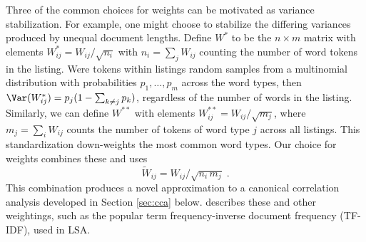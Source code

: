 \documentclass[12pt]{article}
\begin{document}
 Three of the common choices for weights can be motivated as variance stabilization. 
 For example, one might choose to stabilize the differing variances produced by 
 unequal document lengths.  Define
 ${W}^{*}$ to be the $n \times m$ matrix with elements ${W}^{*}_{ij} =
 W_{ij}/\sqrt{n_i}$ with $n_i = \sum_j W_{ij}$ counting the number of word
 tokens in the \ith listing.  Were tokens within listings random samples from a
 multinomial distribution with probabilities $p_{1}, \ldots, p_{m}$ across the word types,
 then $\Var({W}^{*}_{ij}) = p_j(1-\sum_{k\ne j} p_k)$, regardless of the
 number of words in the listing.  Similarly, we can define $W^{**}$ with elements
 $W^{**}_{ij} = W_{ij}/\sqrt{m_j}$, where $m_j = \sum_i W_{ij}$ counts the
 number of tokens of word type $j$ across all listings. This standardization
 down-weights the most common word types.  Our choice for weights combines these and uses
  \begin{equation}
   \widetilde{W}_{ij} = W_{ij}/\sqrt{n_i\,m_j} \;.
  \label{eq:Wtij}
  \end{equation}
  This combination produces a novel approximation to a canonical correlation analysis developed in Section \ref{sec:cca} below. \citet{turney10} describes these and other weightings, such as the popular term frequency-inverse document
 frequency (TF-IDF),  used in LSA. 
  
  
 
\end{document}
